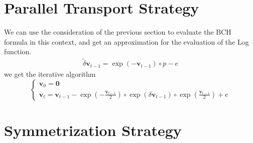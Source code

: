 \section{Parallel Transport Strategy}

We can use the consideration of the previous section to evaluate the BCH formula in this context, and get an approximation for the evaluation of the Log function.
\begin{align*}
\tilde{\delta} \mathbf{v}_{t-1} = \exp(-\mathbf{v}_{t-1})\circ p - e 
\end{align*}
we get the iterative algorithm
\begin{equation}\label{eq:parallel_strategy}
\begin{cases}
\mathbf{v}_0 = \mathbf{0} \\
\mathbf{v}_{t} = \mathbf{v}_{t-1} - \exp(-\frac{\mathbf{v}_{t-1}}{2}) \circ \exp(\delta \mathbf{v}_{t-1}) \circ \exp(\frac{\mathbf{v}_{t-1}}{2}) + e
\end{cases}
\end{equation}

\section{Symmetrization Strategy}

